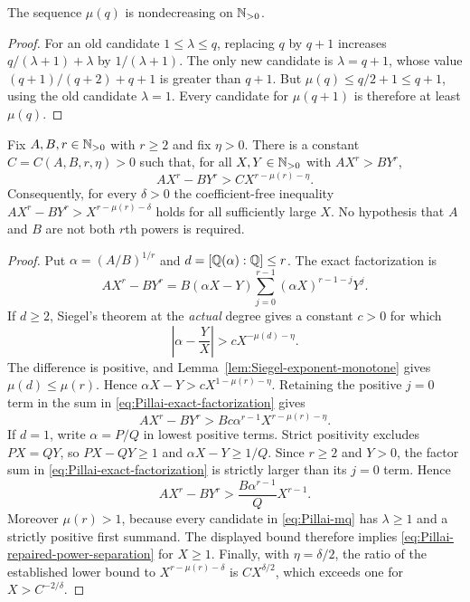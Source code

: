 \begin{lemma}
\label{lem:Siegel-exponent-monotone}
The sequence $\mu(q)$ is nondecreasing on $\mathbb{N}_{>0}$.
\end{lemma}

\begin{proof}
For an old candidate $1\leq\lambda\leq q$, replacing $q$ by $q+1$
increases $q/(\lambda+1)+\lambda$ by $1/(\lambda+1)$.  The only new
candidate is $\lambda=q+1$, whose value
$(q+1)/(q+2)+q+1$ is greater than $q+1$.  But
$\mu(q)\leq q/2+1\leq q+1$, using the old candidate $\lambda=1$.
Every candidate for $\mu(q+1)$ is therefore at least $\mu(q)$.
\end{proof}

\begin{proposition}
\label{prop:Pillai-actual-degree-repair}
Fix $A,B,r\in\mathbb{N}_{>0}$ with $r\geq2$ and fix $\eta>0$.  There is a constant
$C=C(A,B,r,\eta)>0$ such that, for all $X,Y\in\mathbb{N}_{>0}$ with
$AX^r>BY^r$,
\begin{equation}
\label{eq:Pillai-repaired-power-separation}
 AX^r-BY^r>CX^{r-\mu(r)-\eta}.
\end{equation}
Consequently, for every $\delta>0$ the coefficient-free inequality
$AX^r-BY^r>X^{r-\mu(r)-\delta}$ holds for all sufficiently large $X$.
No hypothesis that $A$ and $B$ are not both $r$th powers is required.
\end{proposition}

\begin{proof}
Put $\alpha=(A/B)^{1/r}$ and
$d=[\mathbb{Q}(\alpha):\mathbb{Q}]\leq r$.  The exact factorization is
\begin{equation}
\label{eq:Pillai-exact-factorization}
 AX^r-BY^r
 =B(\alpha X-Y)
   \sum_{j=0}^{r-1}(\alpha X)^{r-1-j}Y^j.
\end{equation}
If $d\geq2$, Siegel's theorem at the \emph{actual} degree gives a constant
$c>0$ for which
\[
 \left|\alpha-\frac YX\right|>cX^{-\mu(d)-\eta}.
\]
The difference is positive, and Lemma~\ref{lem:Siegel-exponent-monotone}
gives $\mu(d)\leq\mu(r)$.  Hence
$\alpha X-Y>cX^{1-\mu(r)-\eta}$.  Retaining the positive $j=0$ term in
the sum in \eqref{eq:Pillai-exact-factorization} gives
\[
 AX^r-BY^r
 >Bc\alpha^{r-1}X^{r-\mu(r)-\eta}.
\]
If $d=1$, write $\alpha=P/Q$ in lowest positive terms.  Strict positivity
excludes $PX=QY$, so $PX-QY\geq1$ and $\alpha X-Y\geq1/Q$.  Since $r\geq2$
and $Y>0$, the factor sum in \eqref{eq:Pillai-exact-factorization} is strictly
larger than its $j=0$ term.  Hence
\[
 AX^r-BY^r>\frac{B\alpha^{r-1}}QX^{r-1}.
\]
Moreover $\mu(r)>1$, because every candidate in \eqref{eq:Pillai-mq} has
$\lambda\geq1$ and a strictly positive first summand.  The displayed bound
therefore implies \eqref{eq:Pillai-repaired-power-separation} for $X\geq1$.
Finally, with $\eta=\delta/2$, the ratio of the established lower bound to
$X^{r-\mu(r)-\delta}$ is $CX^{\delta/2}$, which exceeds one for
$X>C^{-2/\delta}$.
\end{proof}

